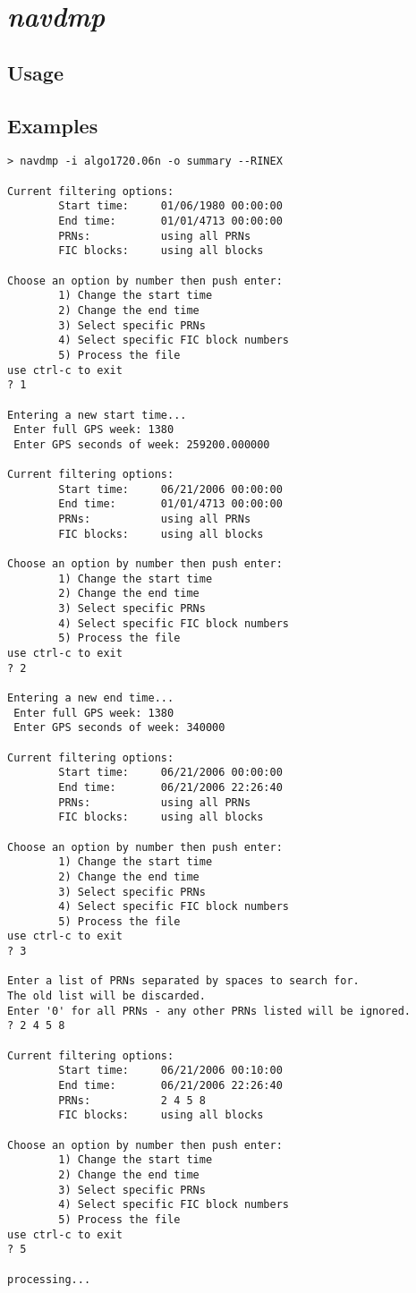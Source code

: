 \section{\emph{navdmp}}
\subsection{Usage}
\subsection{Examples}
\begin{verbatim}
> navdmp -i algo1720.06n -o summary --RINEX

Current filtering options:
        Start time:     01/06/1980 00:00:00
        End time:       01/01/4713 00:00:00
        PRNs:           using all PRNs
        FIC blocks:     using all blocks

Choose an option by number then push enter:
        1) Change the start time
        2) Change the end time
        3) Select specific PRNs
        4) Select specific FIC block numbers
        5) Process the file
use ctrl-c to exit
? 1

Entering a new start time...
 Enter full GPS week: 1380
 Enter GPS seconds of week: 259200.000000

Current filtering options:
        Start time:     06/21/2006 00:00:00
        End time:       01/01/4713 00:00:00
        PRNs:           using all PRNs
        FIC blocks:     using all blocks

Choose an option by number then push enter:
        1) Change the start time
        2) Change the end time
        3) Select specific PRNs
        4) Select specific FIC block numbers
        5) Process the file
use ctrl-c to exit
? 2

Entering a new end time...
 Enter full GPS week: 1380
 Enter GPS seconds of week: 340000

Current filtering options:
        Start time:     06/21/2006 00:00:00
        End time:       06/21/2006 22:26:40
        PRNs:           using all PRNs
        FIC blocks:     using all blocks

Choose an option by number then push enter:
        1) Change the start time
        2) Change the end time
        3) Select specific PRNs
        4) Select specific FIC block numbers
        5) Process the file
use ctrl-c to exit
? 3

Enter a list of PRNs separated by spaces to search for.
The old list will be discarded.
Enter '0' for all PRNs - any other PRNs listed will be ignored.
? 2 4 5 8

Current filtering options:
        Start time:     06/21/2006 00:10:00
        End time:       06/21/2006 22:26:40
        PRNs:           2 4 5 8
        FIC blocks:     using all blocks

Choose an option by number then push enter:
        1) Change the start time
        2) Change the end time
        3) Select specific PRNs
        4) Select specific FIC block numbers
        5) Process the file
use ctrl-c to exit
? 5

processing...
\end{verbatim}
